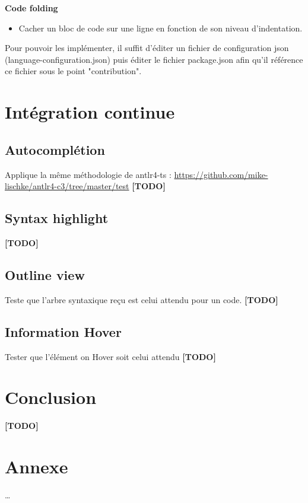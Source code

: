 \documentclass[
    iict, %
    il, %
]{heig-tb}
\begin{document}
\textbf{Code folding}
\begin{itemize}
    \item Cacher un bloc de code sur une ligne en fonction de son niveau d’indentation.
\end{itemize}

Pour pouvoir les implémenter, il suffit d’éditer un fichier de configuration json (language-configuration.json) puis  éditer le fichier package.json afin qu’il référence ce fichier sous le point "contribution".

\chapter{Intégration continue}

\section{Autocomplétion}
Applique la même méthodologie de antlr4-ts : \href{https://github.com/mike-lischke/antlr4-c3/tree/master/test}{https://github.com/mike-lischke/antlr4-c3/tree/master/test}
\textbf{[TODO]}

\section{Syntax highlight}
\textbf{[TODO]}

\section{Outline view}
Teste que l’arbre syntaxique reçu est celui attendu pour un code.
\textbf{[TODO]}

\section{Information Hover}
Tester que l’élément on Hover soit celui attendu
\textbf{[TODO]}

\chapter{Conclusion}
\textbf{[TODO]}

\vfil
\hspace{8cm}\makeatletter\@author\makeatother\par
\hspace{8cm}\begin{minipage}{5cm}
    \printsignature
\end{minipage}
\clearpage


\chapter{Annexe}
\dots

\let\cleardoublepage\clearpage
\backmatter

\label{glossaire}
\printnoidxglossary
\printbibliography
\label{index}
\printindex
\end{document}
